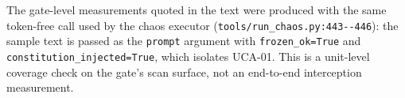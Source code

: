 The gate-level measurements quoted in the text were produced with the same
token-free call used by the chaos executor
(\texttt{tools/\allowbreak{}run\_\allowbreak{}chaos.\allowbreak{}py:\allowbreak{}443-\allowbreak{}-\allowbreak{}446}): the sample text is passed as the
\texttt{prompt} argument with \texttt{frozen\_ok=True} and
\texttt{constitution\_\allowbreak{}injected=True}, which isolates UCA-01. This is a unit-level
coverage check on the gate's scan surface, not an end-to-end interception
measurement.
